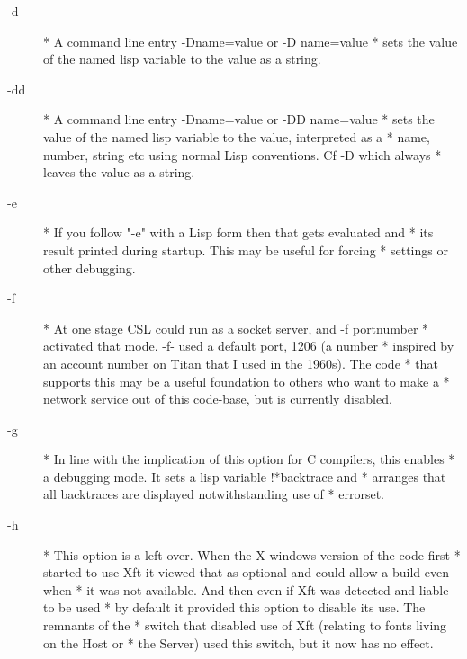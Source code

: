 \documentclass[a4paper,11pt]{article}
\begin{document}
\begin{description}
\item [{\ttfamily -d}] 
          * A command line entry {\ttfamily -Dname=value} or {\ttfamily -D name=value}
          * sets the value of the named lisp variable to the value as a string.

\item [{\ttfamily -dd}] 
          * A command line entry {\ttfamily -Dname=value} or {\ttfamily -DD name=value}
          * sets the value of the named lisp variable to the value, interpreted as a
          * name, number, string etc using normal Lisp conventions. Cf -D which always
          * leaves the value as a string.

\item [{\ttfamily -e}] 
          * If you follow "-e" with a Lisp form then that gets evaluated and
          * its result printed during startup. This may be useful for forcing
          * settings or other debugging.

\item [{\ttfamily -f}] 
          * At one stage CSL could run as a socket server, and {\ttfamily -f portnumber}
          * activated that mode. {\ttfamily -f-} used a default port, 1206 (a number
          * inspired by an account number on Titan that I used in the 1960s). The code
          * that supports this may be a useful foundation to others who want to make a
          * network service out of this code-base, but is currently disabled.

\item [{\ttfamily -g}] 
          * In line with the implication of this option for C compilers, this enables
          * a debugging mode. It sets a lisp variable {\ttfamily !*backtrace} and
          * arranges that all backtraces are displayed notwithstanding use of
          * {\ttfamily errorset}.

\item [{\ttfamily -h}] 
          * This option is a left-over. When the X-windows version of the code first
          * started to use Xft it viewed that as optional and could allow a build even when
          * it was not available. And then even if Xft was detected and liable to be used
          * by default it provided this option to disable its use. The remnants of the
          * switch that disabled use of Xft (relating to fonts living on the Host or
          * the Server) used this switch, but it now has no effect.


\end{description}
\end{document}
